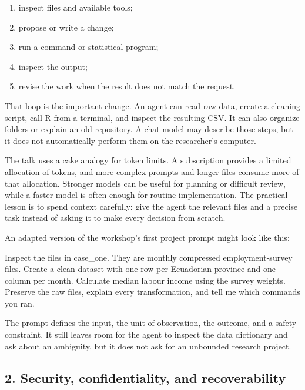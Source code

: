 \documentclass[
  english,
  10pt,
]{article}
\newenvironment{Shaded}{\begin{snugshade}}{\end{snugshade}}
\newcommand{\NormalTok}[1]{\textcolor[rgb]{0.00,0.23,0.31}{#1}}
\providecommand{\tightlist}{%
  \setlength{\itemsep}{0pt}\setlength{\parskip}{0pt}}
\begin{document}
\begin{enumerate}
\def\labelenumi{\arabic{enumi}.}
\tightlist
\item
  inspect files and available tools;
\item
  propose or write a change;
\item
  run a command or statistical program;
\item
  inspect the output;
\item
  revise the work when the result does not match the request.
\end{enumerate}

That loop is the important change. An agent can read raw data, create a
cleaning script, call R from a terminal, and inspect the resulting CSV.
It can also organize folders or explain an old repository. A chat model
may describe those steps, but it does not automatically perform them on
the researcher's computer.

The talk uses a cake analogy for token limits. A subscription provides a
limited allocation of tokens, and more complex prompts and longer files
consume more of that allocation. Stronger models can be useful for
planning or difficult review, while a faster model is often enough for
routine implementation. The practical lesson is to spend context
carefully: give the agent the relevant files and a precise task instead
of asking it to make every decision from scratch.

An adapted version of the workshop's first project prompt might look
like this:

\begin{Shaded}
\begin{Highlighting}[]
\NormalTok{Inspect the files in case\_one. They are monthly compressed employment{-}survey files.}
\NormalTok{Create a clean dataset with one row per Ecuadorian province and one column per month.}
\NormalTok{Calculate median labour income using the survey weights. Preserve the raw files,}
\NormalTok{explain every transformation, and tell me which commands you ran.}
\end{Highlighting}
\end{Shaded}

The prompt defines the input, the unit of observation, the outcome, and
a safety constraint. It still leaves room for the agent to inspect the
data dictionary and ask about an ambiguity, but it does not ask for an
unbounded research project.

\subsection{2. Security, confidentiality, and
recoverability}\label{security-confidentiality-and-recoverability}
\end{document}
